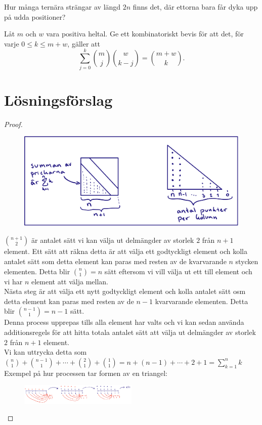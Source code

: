 \documentclass[nobib]{tufte-handout}
\begin{document}
\begin{xca}
  Hur många ternära strängar av längd $2n$ finns det, där ettorna bara får dyka upp på udda positioner?
\end{xca}

\begin{xca}
  Låt $m$ och $w$ vara positiva heltal. Ge ett kombinatoriskt bevis för att det, för varje $0 \leq k \leq m + w$, gäller att
  $$\sum_{j=0}^k \binom{m}{j}\binom{w}{k-j} = \binom{m + w}{k}.$$
\end{xca}

\newpage
\section{Lösningsförslag}

\begin{xca}
\begin{proof}
  \begin{figure}[h]
    \centering
    \includegraphics[]{graphics/Kombinatorik F 2 ls1.png}
  \end{figure}
$\binom{n+1}{2}$ är antalet sätt vi kan välja ut delmängder av storlek $2$ från $n+1$ element. Ett sätt att räkna detta är att välja ett godtyckligt element och kolla antalet sätt som detta element kan paras med resten av de kvarvarande $n$ stycken elementen. Detta blir $\binom{n}{1}=n$ sätt eftersom vi vill välja ut ett till element och vi har $n$ element att välja mellan.\\
Nästa steg är att välja ett nytt godtyckligt element och kolla antalet sätt osm detta element kan paras med resten av de $n-1$ kvarvarande elementen. Detta blir $\binom{n-1}{1}=n-1$ sätt.\\ Denna process upprepas tills alla element har valts och vi kan sedan använda additionsregels för att hitta totala antalet sätt att välja ut delmängder av storlek $2$ från $n+1$ element. \\
Vi kan uttrycka detta som $\binom{n}{1}+\binom{n-1}{1}+\cdots + \binom{2}{1}+\binom{1}{1}=n+(n-1)+\cdots +2+1=\sum_{k=1}^nk$\\
Exempel på hur processen tar formen av en triangel:
 \begin{figure}[h]
    \centering
    \includegraphics[width=0.5\textwidth]{graphics/kombinatorik ls1.png}
  \end{figure}
\end{proof}
\end{xca}
\end{document}
